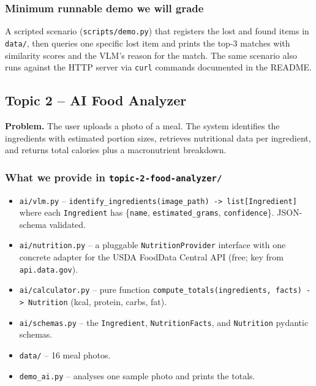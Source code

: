 \documentclass[11pt,a4paper]{article}
\begin{document}
\subsubsection{Minimum runnable demo we will grade}
A scripted scenario (\texttt{scripts/demo.py}) that registers the lost and found items in \texttt{data/}, then queries one specific lost item and prints the top-3 matches with similarity scores and the VLM's reason for the match. The same scenario also runs against the HTTP server via \texttt{curl} commands documented in the README.

\subsection{Topic 2 -- AI Food Analyzer}
\textbf{Problem.} The user uploads a photo of a meal. The system identifies the ingredients with estimated portion sizes, retrieves nutritional data per ingredient, and returns total calories plus a macronutrient breakdown.

\subsubsection{What we provide in \texttt{topic-2-food-analyzer/}}
\begin{itemize}[topsep=2pt,itemsep=1pt]
  \item \texttt{ai/vlm.py} -- \texttt{identify\_ingredients(image\_path) -> list[Ingredient]} where each \texttt{Ingredient} has \{\texttt{name}, \texttt{estimated\_grams}, \texttt{confidence}\}. JSON-schema validated.
  \item \texttt{ai/nutrition.py} -- a pluggable \texttt{NutritionProvider} interface with one concrete adapter for the USDA FoodData Central API (free; key from \texttt{api.data.gov}).
  \item \texttt{ai/calculator.py} -- pure function \texttt{compute\_totals(ingredients, facts) -> Nutrition} (kcal, protein, carbs, fat).
  \item \texttt{ai/schemas.py} -- the \texttt{Ingredient}, \texttt{NutritionFacts}, and \texttt{Nutrition} pydantic schemas.
  \item \texttt{data/} -- 16 meal photos.
  \item \texttt{demo\_ai.py} -- analyses one sample photo and prints the totals.
\end{itemize}
\end{document}
